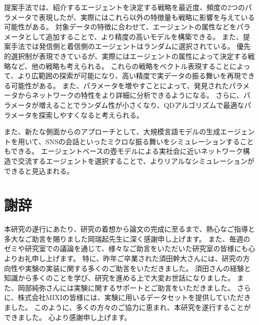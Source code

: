 \documentclass[uplatex,11pt,openany]{ujreport}
\renewcommand{\bibname}{参考文献}
\begin{document}
    提案手法では、紹介するエージェントを決定する戦略を最近度、頻度の2つのパラメータで表現したが、実際にはこれら以外の特徴量も戦略に影響を与えている可能性がある。
    対象データの特徴に合わせて、エージェントの属性などをパラメータとして追加することで、より精度の高いモデルを構築できる。
    また、提案手法では発信側と着信側のエージェントはランダムに選択されている。
    優先的選択制が表現できているが、実際にはエージェントの属性によって決定する戦略など、他の戦略も考えられる。
    これらの戦略をベクトル表現することによって、より広範囲の探索が可能になり、高い精度で実データの振る舞いを再現できる可能性がある。
    また、パラメータを増やすことによって、発見されたパラメータからネットワークの特性をより詳細に分析できるようになる。
    さらに、パラメータが増えることでランダム性が小さくなり、QDアルゴリズムで最適なパラメータを探索しやすくなると考えられる。

    また、新たな側面からのアプローチとして、大規模言語モデルの生成エージェント\cite{parkGenerativeAgentsInteractive2023}を用いて、SNSの会話といったミクロな振る舞いをシミュレーションすることもできる。
    エージェントベースの壺モデルによる実社会に近いネットワーク構造で交流するエージェントを選択することで、よりリアルなシミュレーションができると見込まれる。










\chapter*{謝辞}
    本研究の遂行にあたり、研究の着想から論文の完成に至るまで、熱心なご指導と多大なご助言を賜りました岡瑞起先生に深く感謝申し上げます。
    また、毎週のゼミや研究室での議論を通じて、様々なご助言をいただいた研究室の皆様にも心よりお礼申し上げます。
    特に、昨年ご卒業された須田幹大さんには、研究の方向性や実験の実装に関する多くのご助言をいただきました。
    須田さんの経験と知識から多くのことを学び、研究を進める上で大変お世話になりました。
    また、岡部純弥さんには実験に関するサポートとご助言をいただきました。
    さらに、株式会社MIXIの皆様には、実験に用いるデータセットを提供していただきました。
    このように、多くの方々のご協力に恵まれ、本研究を遂行することができました。
    心より感謝申し上げます。


\newpage


% 
% 





\end{document}
